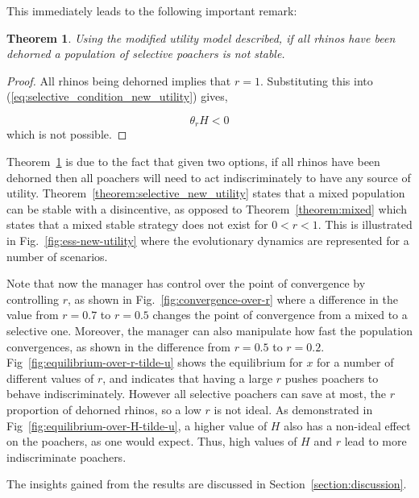 \documentclass[10pt]{article}
\newtheorem{theorem}{Theorem}
\begin{document}
This immediately leads to the following important remark:

\begin{theorem}\label{theorem:devaluating_rhinos}
Using the modified utility model described,
if all rhinos have been dehorned a population of selective poachers is not
stable.
\end{theorem}

\begin{proof}
All rhinos being dehorned implies that \(r=1\). Substituting this into
(\ref{eq:selective_condition_new_utility}) gives,

\begin{equation}
    \theta_r H < 0
\end{equation}
which is not possible.
\end{proof}

Theorem~\ref{theorem:devaluating_rhinos} is due to the fact that given two
options, if all rhinos have been dehorned then all poachers will need to act
indiscriminately to have any source of utility. Theorem~\ref{theorem:selective_new_utility}
states that a  mixed population can be stable with a disincentive, as opposed to
Theorem~\ref{theorem:mixed} which states that a mixed stable strategy does not
exist for \(0 <r <1\). This is illustrated in Fig.~\ref{fig:ess-new-utility} where
the evolutionary dynamics are represented for a number of scenarios.

Note that now the manager has control over the point of convergence by
controlling \(r\), as shown in Fig.~\ref{fig:convergence-over-r}
where
a difference in the value from \(r=0.7\) to \(r=0.5\) changes the point of
convergence from a mixed to a selective one. Moreover, the manager can also
manipulate how fast the population convergences, as shown in the difference from
\(r=0.5\) to \(r=0.2\). Fig~\ref{fig:equilibrium-over-r-tilde-u} shows the
equilibrium for \(x\) for a number of different values of \(r\), and indicates
that having a large \(r\) pushes poachers to behave indiscriminately. However all
selective poachers can save at most, the $r$ proportion of dehorned rhinos, so a
low \(r\) is not ideal. As demonstrated in Fig~\ref{fig:equilibrium-over-H-tilde-u},
a higher value of \(H\) also has a non-ideal effect on the poachers, as one would
expect. Thus, high values of \(H\) and \(r\) lead to more indiscriminate poachers.

The insights gained from the results are discussed in Section~\ref{section:discussion}.
\end{document}
